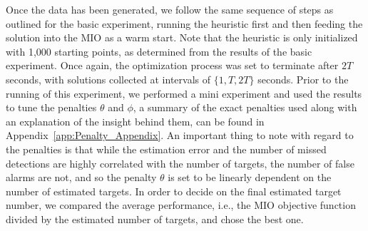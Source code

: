 Once the data has been generated, we follow the same sequence of steps as outlined for the basic experiment, running the heuristic first and then feeding the solution into the MIO as a warm start. Note that the heuristic is only initialized with 1,000 starting points, as determined from the results of the basic experiment. Once again, the optimization process was set to terminate after $2T$ seconds, with solutions collected at intervals of $\{1,T,2T\}$ seconds. Prior to the running of this experiment, we performed a mini experiment and used the results to tune the penalties $\theta$ and $\phi$, a summary of the exact penalties used along with an explanation of the insight behind them, can be found in Appendix~\ref{app:Penalty_Appendix}. An important thing to note with regard to the penalties is that while the estimation error and the number of missed detections are highly correlated with the number of targets, the number of false alarms are not, and so the penalty $\theta$ is set to be linearly dependent on the number of estimated targets. In order to decide on the final estimated target number, we compared the average performance, i.e., the MIO objective function divided by the estimated number of targets, and chose the best one. 


